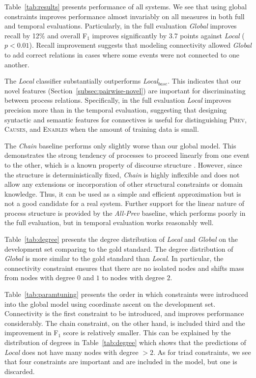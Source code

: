Table~\ref{tab:results} presents performance of all systems. We see that using global constraints improves performance almost invariably on all measures in both full and temporal evaluations. Particularly, in the full evaluation \emph{Global} improves recall by 12\% and overall F$_1$ improves significantly by 3.7 points against \emph{Local} ($p<0.01$). Recall improvement suggests that modeling connectivity allowed \emph{Global} to add correct relations in cases where some events were not connected to one another.

The \emph{Local} classifier substantially outperforms \emph{Local$_{base}$}. This indicates that our novel features (Section~\ref{subsec:pairwise-novel}) are important for discriminating between process relations. Specifically, in the full evaluation \emph{Local} improves precision more than in the temporal evaluation, suggesting that designing syntactic and semantic features for connectives is useful for distinguishing \textsc{Prev}, \textsc{Causes}, and \textsc{Enables} when the amount of training data is small.

The \emph{Chain} baseline performs only slightly worse than our global model. This demonstrates the strong tendency of processes to proceed linearly from one event to the other, which is a known property of discourse structure \cite{schegloff73}.  However, since the structure is deterministically fixed, \emph{Chain} is highly inflexible and does not allow any extensions or incorporation of other structural constraints or domain knowledge. Thus, it can be used as a simple and efficient approximation but is not a good candidate for a real system. Further support for the linear nature of process structure is provided by the \emph{All-Prev} baseline, which performs poorly in the full evaluation, but in temporal evaluation works reasonably well. 

Table~\ref{tab:degree} presents the degree distribution of \emph{Local} and \emph{Global} on the development set comparing to the gold standard. The degree distribution of \emph{Global} is  more similar to the gold standard than \emph{Local}. In particular, the connectivity constraint ensures that there are no isolated nodes and shifts mass from nodes with degree $0$ and $1$ to nodes with degree $2$.

Table~\ref{tab:paramtuning} presents the order in which constraints were introduced into the global model using coordinate ascent on the development set. Connectivity is the first constraint to be introduced, and improves performance considerably. The chain constraint, on the other hand, is included third and the improvement in F$_{1}$ score is relatively smaller. This can be explained by the distribution of degrees in Table~\ref{tab:degree} which shows that the predictions of \emph{Local} does not have many nodes with degree $>2$. As for triad constraints, we see that four constraints are important and are included in the model, but one is discarded.

